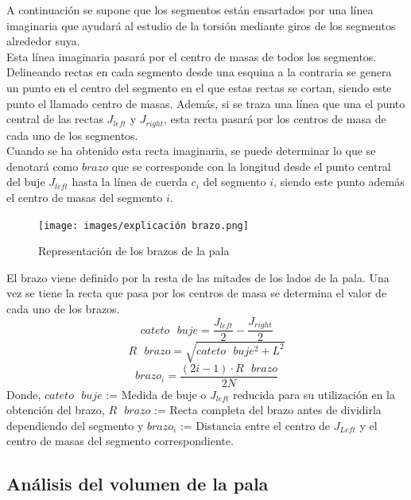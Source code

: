 A continuación se supone que los segmentos están ensartados por una línea imaginaria que ayudará al estudio de la torsión mediante giros de los segmentos alrededor suya. \\

Esta línea imaginaria pasará por el centro de masas de todos los segmentos. Delineando rectas en cada segmento desde una esquina a la contraria se genera un punto en el centro del segmento en el que estas rectas se cortan, siendo este punto el llamado centro de masas. Además, si se traza una línea que una el punto central de las rectas $J_{left}$ y $J_{right}$, esta recta pasará por los centros de masa de cada uno de los segmentos.\\

Cuando se ha obtenido esta recta imaginaria, se puede determinar lo que se denotará como $brazo$ que se corresponde con la longitud desde el punto central del buje $J_{left}$ hasta la línea de cuerda $c_{i}$ del segmento $i$, siendo este punto además el centro de masas del segmento $i$.


    \begin{figure}[H]
    \centering
    \texttt{[image: images/explicación brazo.png]}
    \caption{Representación de los brazos de la pala}
    \label{fig:exp_brazo}
    
\end{figure}

El brazo viene definido por la resta de las mitades de los lados de la pala. Una vez se tiene la recta que pasa por los centros de masa se determina el valor de cada uno de los brazos.
\begin{equation}
cateto \text{ } buje = \dfrac{J_{left}}{2} - \dfrac{J_{right}}{2}
\end{equation}
\begin{equation}
R \text{ } brazo = \sqrt{cateto \text{ } buje^{2} + L^{2}}
\end{equation}
\begin{equation}
brazo_i = \dfrac{(2i -1) \cdot R \text{ } brazo}{2N}
\end{equation}
Donde, $cateto \text{ } buje$ := Medida de buje o $J_{left}$ reducida para su utilización en la obtención del brazo, $R \text{ } brazo$ := Recta completa del brazo antes de dividirla dependiendo del segmento y $brazo_i$ := Distancia entre el centro de $J_{Left}$ y el centro de masas del segmento correspondiente.

\subsection{Análisis del volumen de la pala}
\label{section:volumen_pala}

